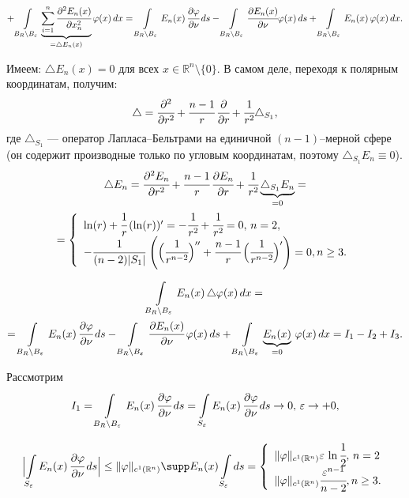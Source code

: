 \documentclass[unicode,12pt,draft]{article}
\begin{document}
$$+\int\limits_{B_R\setminus
B_{\varepsilon}}\underbrace{\sum_{i=1}^n\cfrac{\partial^2
E_n(x)}{\partial x_n^2}}_{=\triangle E_n(x)}\varphi(x)\,dx=
\int\limits_{B_R\setminus B_{\varepsilon}}E_n(x)\, \cfrac{\partial
\varphi}{\partial \nu}\,ds- \int\limits_{B_R\setminus
B_{\varepsilon}}\cfrac{\partial E_n(x)}{\partial
\nu}\varphi(x)\,ds+ \int\limits_{B_R\setminus
B_{\varepsilon}}E_n(x)\,\varphi(x)\,dx.$$

Имеем: $\triangle E_n(x)=0$ для всех $x\in \mathbb
R^n\setminus\{0\}.$ В самом деле, переходя к полярным координатам,
получим:
$$\triangle=\cfrac{\partial^2}{\partial
r^2}+\cfrac{n-1}r\,\cfrac{\partial}{\partial r}+
\cfrac1{r^2}\triangle_{S_1},$$ где $\triangle_{S_1}$ --- оператор
Лапласа--Бельтрами на единичной $(n-1)$--мерной сфере (он содержит
производные только по угловым координатам, поэтому
$\triangle_{S_1}E_n\equiv0$).
\begin{multline}
\triangle E_n=\cfrac{\partial^2 E_n}{\partial
r^2}+\cfrac{n-1}r\,\cfrac{\partial E_n}{\partial r}+
\cfrac1{r^2}\underbrace{\triangle_{S_1}E_n}_{=0}=\\=
\left\{%
\begin{array}{ll}
    \ln(r)+\cfrac1r\,( \ln(r))'=-\cfrac1{r^2}+\cfrac1{r^2}=0,\,n=2, \\
    -\cfrac1{(n-2)|S_1|}\,\left( \Bigl(\cfrac1{r^{n-2}}\Bigr)''+\cfrac{n-1}r\,\Bigl(\cfrac1{r^{n-2}}\Bigr)'\right)=0, n\ge3.\\
\end{array}%
\right.
\end{multline}


\begin{multline}
\int\limits_{B_R\setminus
B_{\varepsilon}}E_n(x)\,\triangle \varphi(x)\,dx=\\=
\int\limits_{B_R\setminus B_{\varepsilon}}E_n(x)\, \cfrac{\partial
\varphi}{\partial \nu}\,ds- \int\limits_{B_R\setminus
B_{\varepsilon}}\cfrac{\partial E_n(x)}{\partial
\nu}\,\varphi(x)\,ds+\int\limits_{B_R\setminus
B_{\varepsilon}}\underbrace{E_n(x)}_{=0}\,\varphi(x)\,dx=I_1-I_2+I_3.
\end{multline}

Рассмотрим $$I_1=\int\limits_{B_R\setminus
B_{\varepsilon}}E_n(x)\, \cfrac{\partial \varphi}{\partial
\nu}\,ds= \int\limits_{S_\varepsilon}E_n(x)\, \cfrac{\partial
\varphi}{\partial \nu}\,ds\to0,\,\varepsilon\to+0,$$

$$\Bigl|\int\limits_{S_\varepsilon}E_n(x)\, \cfrac{\partial
\varphi}{\partial \nu}\,ds\Bigr|\le \|\varphi\|_{c^1(\mathbb
R^n)}\supp E_n(x)\int\limits_{S_\varepsilon}ds=
\left\{%
\begin{array}{ll}
    \|\varphi\|_{c^1(\mathbb
R^n)}\varepsilon\,\ln\cfrac12,\,n=2  \\
    \|\varphi\|_{c^1(\mathbb
R^n)}\cfrac{\varepsilon^{n-1}}{n-2}, n\ge3. \\
\end{array}%
\right.    $$
\end{document}
